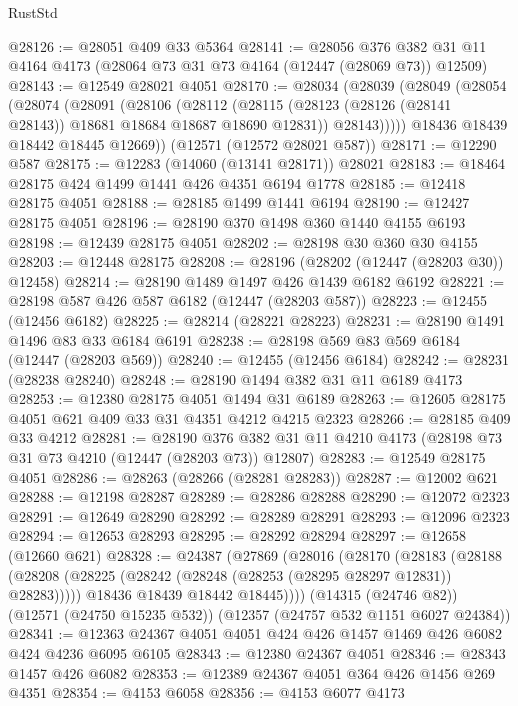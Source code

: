 \begin{lexlean}{RustStd}
\begin{coremodule}
@28126 := @28051 @409 @33 @5364
@28141 := @28056
    @376
    @382
    @31
    @11
    @4164
    @4173
    (@28064 @73 @31 @73 @4164 (@12447 (@28069 @73)) @12509)
@28143 := @12549 @28021 @4051
@28170 := @28034
    (@28039
      (@28049
        (@28054
          (@28074
            (@28091
              (@28106
                (@28112
                  (@28115 (@28123 (@28126 (@28141 @28143)) @18681 @18684 @18687 @18690 @12831))
                  @28143)))))
        @18436
        @18439
        @18442
        @18445
        @12669))
    (@12571 (@12572 @28021 @587))
@28171 := @12290 @587
@28175 := @12283 (@14060 (@13141 @28171)) @28021
@28183 := @18464 @28175 @424 @1499 @1441 @426 @4351 @6194 @1778
@28185 := @12418 @28175 @4051
@28188 := @28185 @1499 @1441 @6194
@28190 := @12427 @28175 @4051
@28196 := @28190 @370 @1498 @360 @1440 @4155 @6193
@28198 := @12439 @28175 @4051
@28202 := @28198 @30 @360 @30 @4155
@28203 := @12448 @28175
@28208 := @28196 (@28202 (@12447 (@28203 @30)) @12458)
@28214 := @28190 @1489 @1497 @426 @1439 @6182 @6192
@28221 := @28198 @587 @426 @587 @6182 (@12447 (@28203 @587))
@28223 := @12455 (@12456 @6182)
@28225 := @28214 (@28221 @28223)
@28231 := @28190 @1491 @1496 @83 @33 @6184 @6191
@28238 := @28198 @569 @83 @569 @6184 (@12447 (@28203 @569))
@28240 := @12455 (@12456 @6184)
@28242 := @28231 (@28238 @28240)
@28248 := @28190 @1494 @382 @31 @11 @6189 @4173
@28253 := @12380 @28175 @4051 @1494 @31 @6189
@28263 := @12605 @28175 @4051 @621 @409 @33 @31 @4351 @4212 @4215 @2323
@28266 := @28185 @409 @33 @4212
@28281 := @28190
    @376
    @382
    @31
    @11
    @4210
    @4173
    (@28198 @73 @31 @73 @4210 (@12447 (@28203 @73)) @12807)
@28283 := @12549 @28175 @4051
@28286 := @28263 (@28266 (@28281 @28283))
@28287 := @12002 @621
@28288 := @12198 @28287
@28289 := @28286 @28288
@28290 := @12072 @2323
@28291 := @12649 @28290
@28292 := @28289 @28291
@28293 := @12096 @2323
@28294 := @12653 @28293
@28295 := @28292 @28294
@28297 := @12658 (@12660 @621)
@28328 := @24387
    (@27869
      (@28016
        (@28170
          (@28183
            (@28188 (@28208 (@28225 (@28242 (@28248 (@28253 (@28295 @28297 @12831)) @28283)))))
            @18436
            @18439
            @18442
            @18445))))
    (@14315 (@24746 @82))
    (@12571 (@24750 @15235 @532))
    (@12357 (@24757 @532 @1151 @6027 @24384))
@28341 := @12363 @24367 @4051 @4051 @424 @426 @1457 @1469 @426 @6082 @424 @4236 @6095 @6105
@28343 := @12380 @24367 @4051
@28346 := @28343 @1457 @426 @6082
@28353 := @12389 @24367 @4051 @364 @426 @1456 @269 @4351
@28354 := @4153 @6058
@28356 := @4153 @6077 @4173

\end{coremodule}
\end{lexlean}
